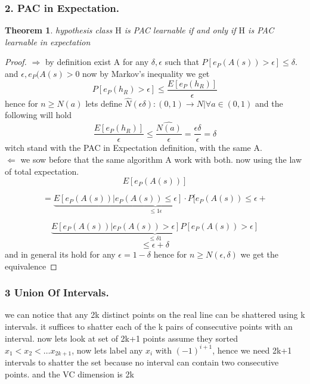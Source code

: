\documentclass[12pt]{article}
\theoremstyle{plain}
\newtheorem*{theorem*}{Theorem}
\begin{document}
 \subsubsection*{ 2. PAC in Expectation. }
 \begin{theorem*} hypothesis class $\mathrm{H}$ is PAC learnable if and only if $\mathrm{H}$ is PAC learnable in expectation \end{theorem*}
\begin{proof}
$\Rightarrow$
by definition exist A for any $\delta ,\epsilon $  such that $ P [  e_P(A(s)) > \epsilon] \leq \delta $.  \\and $\epsilon ,e_P(A(s)>0$ now by Markov’s
inequality we get
\[ 
 P [  e_P(h_R) > \epsilon] \leq  \frac{E [  e_P(h_R) ]}{\epsilon}
 \] 
hence for $n \geq N(a) $ lets define $ \hat{N} (\epsilon \delta) : (0, 1) \rightarrow N |\forall a \in (0,1) $ and the following will hold 
 \[ \frac{E [  e_P(h_R) ]}{\epsilon}\leq \frac{\hat{N(a)}}{\epsilon}=\frac{\epsilon \delta}{\epsilon}=\delta 
  \]
  witch stand with the PAC in Expectation definition, with the same A.\\ 

 $\Leftarrow$ we sow before that the same algorithm A work with both.
 now using the law of total expectation.
  \[
  E [e_P(A(s))]
   \]
  
\[ = \underbrace{E [e_P(A(s))|e_P(A(s)) \leq \epsilon ]· P [e_P(A(s)) \leq \epsilon }_{\leq 1\epsilon}
+ 
 \]
  
\[
 \underbrace{E [e_P(A(s))|e_P (A (s)) >\epsilon ]P [e_P(A(s)) > \epsilon ]}_{\leq \delta1}
\]
\[
 \leq \epsilon + \delta
\]
and in general its hold for any $\epsilon =1-\delta$ hence for $n\geq N(\epsilon,\delta)$ we get the equivalence
\end{proof}
 \subsubsection*{ 3 Union Of Intervals.}
 we can notice that any 2k distinct points on the real line can be
shattered using k intervals. it suffices to shatter each of the k pairs of
consecutive points with an interval.
now lets look at set of 2k+1 points assume they sorted {$x_1<x_2<\dots x_{2k+1}$}, now lets label any $x_i$ with $(-1)^{i+1}$, hence we need 2k+1 intervals to shatter the set because  no interval can contain two consecutive points. and the VC dimension is 2k
\end{document}
